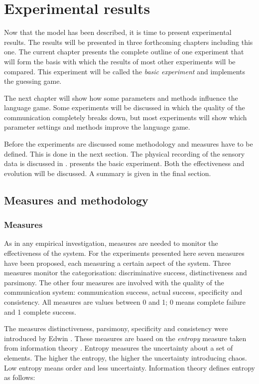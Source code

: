 \chapter{Experimental results}\label{ch:basic}


Now that the model has been described, it is time to present
experimental results. The results will be presented in three
forthcoming chapters including this one. The current chapter presents the complete outline of one experiment that will form the basis with which
the results of most other experiments will be compared. This experiment will be called the {\em basic experiment} and implements the guessing game.

The next chapter will show how some parameters and methods
influence the language game. Some experiments will be discussed
in which the quality of the communication completely breaks
down, but most experiments will show which parameter settings
and methods improve the language game.


Before the experiments are discussed some methodology and measures have
to be defined. This is done in the next section. The physical
recording of the sensory data is discussed in .  presents the
basic experiment. Both the effectiveness and evolution will be
discussed. A summary is given in the final section.

\section{Measures and methodology}\label{s:st:measures}

\subsection{Measures}

As in any empirical investigation, measures are needed to
monitor the effectiveness of the system. For the experiments
presented here seven measures have been proposed, each measuring
a certain aspect of the system. Three measures monitor the categorisation: {\sc discriminative success}, {\sc
distinctiveness} and {\sc parsimony}. The other four measures
are involved with the quality of the communication system: {\sc
communication success}, {\sc actual success}, {\sc
specificity} and {\sc consistency}. All measures are values between 0 and 1; 0 means complete failure and 1 complete success.

The measures distinctiveness, parsimony, specificity and consistency were introduced by Edwin \citet{dejong:2000}. These measures are based on the {\em entropy} measure taken from information theory \citep{shannon:1948}. Entropy measures the uncertainty about a set of elements. The higher the entropy, the higher the uncertainty introducing chaos. Low entropy means order and less uncertainty. Information theory defines entropy as follows:

